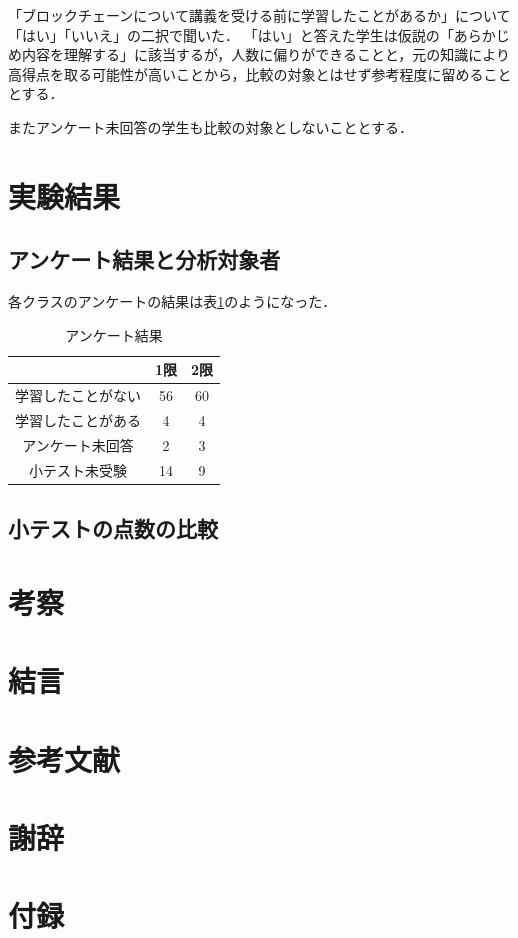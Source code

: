 \documentclass[a4j,12pt]{jsarticle}
\begin{document}
「ブロックチェーンについて講義を受ける前に学習したことがあるか」について「はい」「いいえ」の二択で聞いた．
「はい」と答えた学生は仮説の「あらかじめ内容を理解する」に該当するが，人数に偏りができることと，元の知識により高得点を取る可能性が高いことから，比較の対象とはせず参考程度に留めることとする．

またアンケート未回答の学生も比較の対象としないこととする．

\newpage
\section{実験結果}
\subsection{アンケート結果と分析対象者}
各クラスのアンケートの結果は表\ref{fig:ank}のようになった．

\begin{table}[H]
\centering
\begin{tabular}{|c|c|c|}
\hline
\multicolumn{1}{|l|}{} & \multicolumn{1}{l|}{1限} & \multicolumn{1}{l|}{2限} \\ \hline
学習したことがない              & 56                      & 60                      \\ \hline
学習したことがある              & 4                       & 4                       \\ \hline
アンケート未回答               & 2                       & 3                       \\ \hline
小テスト未受験                & 14                      & 9                       \\ \hline
\end{tabular}
\caption{アンケート結果}
\label{fig:ank}
\end{table}


\subsection{小テストの点数の比較}

\newpage
\section{考察}

\newpage
\section{結言}

\section{参考文献}

\section{謝辞}

\section{付録}
\end{document}
